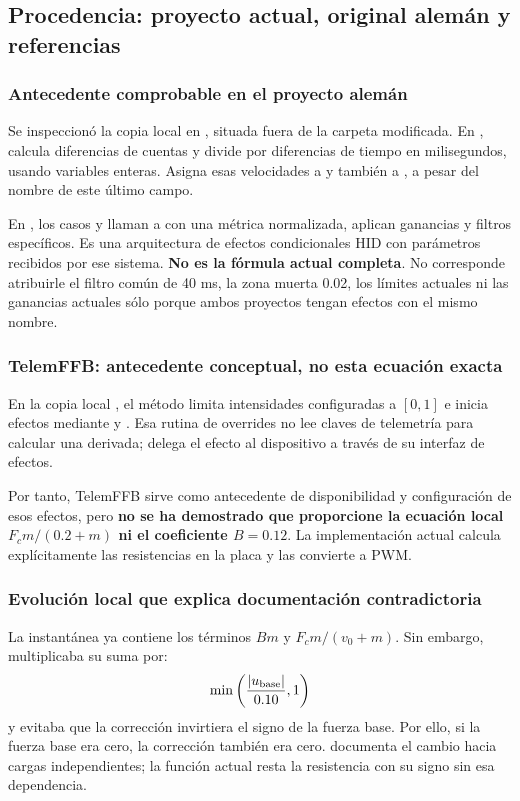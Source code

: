 \subsection{Procedencia: proyecto actual, original alemán y referencias}
\label{sec:origen_damper_friccion}
\subsubsection{Antecedente comprobable en el proyecto alemán}
Se inspeccionó la copia local en , situada fuera de la carpeta modificada. En , calcula diferencias de cuentas y divide por diferencias de tiempo en milisegundos, usando variables enteras. Asigna esas velocidades a  y también a , a pesar del nombre de este último campo.

En , los casos  y  llaman a  con una métrica normalizada, aplican ganancias y filtros específicos. Es una arquitectura de efectos condicionales HID con parámetros recibidos por ese sistema. \textbf{No es la fórmula actual completa}. No corresponde atribuirle el filtro común de 40 ms, la zona muerta 0.02, los límites actuales ni las ganancias actuales sólo porque ambos proyectos tengan efectos con el mismo nombre.

\subsubsection{TelemFFB: antecedente conceptual, no esta ecuación exacta}
En la copia local , el método  limita intensidades configuradas a $[0,1]$ e inicia efectos mediante  y . Esa rutina de overrides no lee claves de telemetría para calcular una derivada; delega el efecto al dispositivo a través de su interfaz de efectos.

Por tanto, TelemFFB sirve como antecedente de disponibilidad y configuración de esos efectos, pero \textbf{no se ha demostrado que proporcione la ecuación local $F_cm/(0.2+m)$ ni el coeficiente $B=0.12$}. La implementación actual calcula explícitamente las resistencias en la placa y las convierte a PWM.

\subsubsection{Evolución local que explica documentación contradictoria}
La instantánea  ya contiene los términos $Bm$ y $F_cm/(v_0+m)$. Sin embargo, multiplicaba su suma por:
\begin{equation}
\min\left(\frac{|u_{\rm base}|}{0.10},1\right)
\end{equation}
y evitaba que la corrección invirtiera el signo de la fuerza base. Por ello, si la fuerza base era cero, la corrección también era cero.  documenta el cambio hacia cargas independientes; la función actual resta la resistencia con su signo sin esa dependencia.

